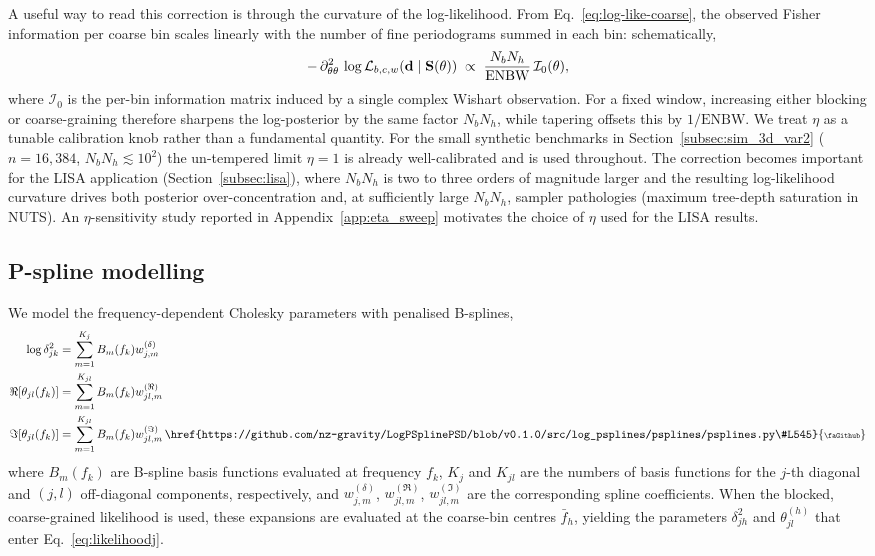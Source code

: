 \documentclass[%
	reprint,
	nofootinbib,
	amsmath,
	amssymb,
	aps,
]{revtex4-2}
\DeclareRobustCommand{\codelink}[1]{\,\href{#1}{\mbox{\scalebox{0.65}{\faGithub}}}}
\renewcommand{\d}{{\bf d}}
\renewcommand{\S}{{\bf S}}
\begin{document}
	A useful way to read this correction is through the curvature of the
	log-likelihood. From Eq.~\eqref{eq:log-like-coarse}, the observed
	Fisher information per coarse bin scales linearly with the number of
	fine periodograms summed in each bin: schematically,
	\begin{equation}
		\label{eq:fisher-scaling}
		-\,\partial^{2}_{\theta\theta}\,\log\mathcal{L}_{b,c,w}(\d\mid\S(\theta))
		\;\propto\; \frac{N_{b}N_{h}}{\mathrm{ENBW}}\,\mathcal{I}_{0}(\theta),
	\end{equation}
	where $\mathcal{I}_{0}$ is the per-bin information matrix induced by
	a single complex Wishart observation. For a fixed window, increasing either
	blocking or coarse-graining therefore sharpens the log-posterior by the
	same factor $N_{b}N_{h}$, while tapering offsets this by
	$1/\mathrm{ENBW}$. We treat $\eta$ as a tunable calibration
	knob rather than a fundamental quantity. For the small synthetic
	benchmarks in Section~\ref{subsec:sim_3d_var2}
	($n=16{,}384$, $N_{b}N_{h}\!\lesssim\!10^{2}$) the un-tempered limit
	$\eta=1$ is already well-calibrated and is used throughout. The
	correction becomes important for the LISA application
	(Section~\ref{subsec:lisa}), where $N_{b}N_{h}$ is two to three orders
	of magnitude larger and the resulting log-likelihood curvature drives
	both posterior over-concentration and, at sufficiently large
	$N_{b}N_{h}$, sampler pathologies (maximum tree-depth saturation in
	NUTS). An $\eta$-sensitivity study reported in
	Appendix~\ref{app:eta_sweep} motivates the choice of $\eta$ used
	for the LISA results.


	\subsection{P-spline modelling}
	We model the frequency-dependent Cholesky parameters with penalised
	B-splines,
	\begin{align}
		\log \delta_{jk}^{2}    & = \sum_{m=1}^{K_j}B_{m}(f_{k}) w_{j,m}^{(\delta)}\label{eq:delta_spline}     \\
		\Re[\theta_{jl}(f_{k})] & = \sum_{m=1}^{K_{jl}}B_{m}(f_{k}) w_{jl,m}^{(\Re)}\label{eq:theta_re_spline} \\
		\Im[\theta_{jl}(f_{k})] & = \sum_{m=1}^{K_{jl}}B_{m}(f_{k}) w_{jl,m}^{(\Im)}\label{eq:theta_im_spline} \codelink{https://github.com/nz-gravity/LogPSplinePSD/blob/v0.1.0/src/log_psplines/psplines/psplines.py\#L545}
	\end{align}
	where $B_{m}(f_{k})$ are B-spline basis functions evaluated at frequency
	$f_{k}$, $K_{j}$ and $K_{jl}$ are the numbers of basis functions for the
	$j$-th diagonal and $(j,l)$ off-diagonal components, respectively, and
	$w_{j,m}^{(\delta)}$, $w_{jl,m}^{(\Re)}$, $w_{jl,m}^{(\Im)}$ are the
	corresponding spline coefficients. When the blocked, coarse-grained
	likelihood is used, these expansions are evaluated at the coarse-bin
	centres $\bar{f}_{h}$, yielding the parameters $\delta_{jh}^{2}$ and
	$\theta_{jl}^{(h)}$ that enter Eq.~\eqref{eq:likelihoodj}.
\end{document}
